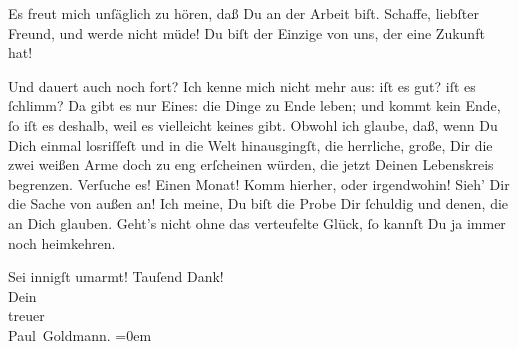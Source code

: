\pstart
           Es freut mich unſäglich zu hören, daß Du an der Arbeit biſt. Schaffe, liebſter
               Freund, und werde nicht {\pb}müde! Du biſt der Einzige von
               uns, der eine Zukunft hat!\pend
           
\pstart
           Und \label{K_L02699-5v}\label{K_L02699-5} dauert auch noch
               fort? Ich kenne mich nicht mehr aus: iſt es gut? iſt es ſchlimm? Da gibt es nur
               Eines: die Dinge zu Ende leben; und  kommt kein
               Ende, ſo iſt es deshalb, weil es vielleicht keines gibt. Obwohl ich glaube, daß, wenn
               Du Dich einmal losriſſeſt und in die Welt hinausgingſt, die herrliche, große, Dir die
               zwei weißen Arme doch zu eng
               erſcheinen würden, die jetzt Deinen {\pb}Lebenskreis
               begrenzen. Verſuche es! Einen Monat! Komm hierher, oder irgendwohin! Sieh’ Dir die
                  Sache von außen an! Ich
               meine, Du biſt die Probe Dir ſchuldig und denen, die an Dich glauben. Geht’s
                  nicht\strikeout{,} ohne das verteufelte Glück, ſo kannſt Du ja immer noch
               heimkehren.\pend
           
\pstart
           Sei innigſt umarmt! Tauſend Dank! {\\[\baselineskip]}Dein{\\[\baselineskip]}treuer{\\[\baselineskip]}\spacefill\mbox{Paul Goldmann.}\pend
           \leftskip=0em{}\endnumbering{}  
      